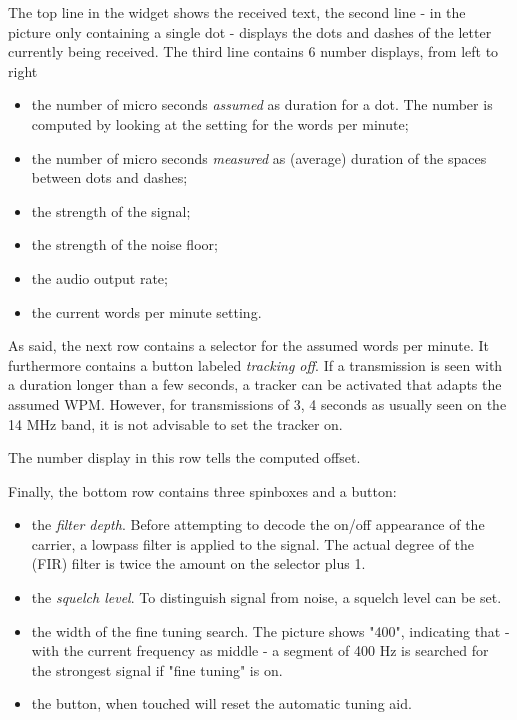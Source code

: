 \documentclass[11pt]{article}
\begin{document}
The top line in the widget shows the received text,
the second line - in the picture only containing a single dot -
displays the dots and dashes of the letter currently being received.
The third line contains 6 number displays, from left to right
\begin{itemize}
\item the number of micro seconds {\em assumed} as duration for a dot. The 
number is computed by looking at the setting for the words per minute;
\item the number of micro seconds {\em measured} as (average) duration of
the spaces between dots and dashes;
\item the strength of the signal;
\item the strength of the noise floor;
\item the audio output rate; 
\item the current words per minute setting.
\end{itemize}

As said, the next row contains a selector for the assumed words per minute.
It furthermore contains a button labeled {\em tracking off}. If a transmission
is seen with a duration longer than a few seconds, a tracker can be activated
that adapts the assumed WPM. However, for transmissions of 3, 4 seconds
as usually seen on the 14 MHz band, it is not advisable to set the tracker on.

The number display in this row tells the computed offset.

Finally, the bottom row contains three spinboxes and a button:
\begin{itemize}
\item the {\em filter depth}. Before attempting to decode the on/off appearance
of the carrier, a lowpass filter is applied to the signal. The actual
degree of the (FIR) filter is twice the amount on the selector plus 1.
\item the {\em squelch level}. To distinguish signal from noise, a squelch level
can be set.
\item the width of the fine tuning search. The picture shows "400", indicating
that - with the current frequency as middle - a segment of 400 Hz is searched
for the strongest signal if "fine tuning" is on.
\item the button, when touched will reset the automatic tuning aid.
\end{itemize}
\end{document}

